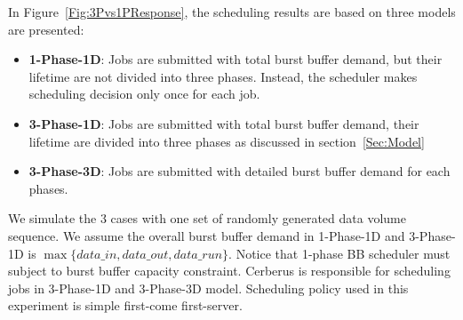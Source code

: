 
In Figure~\ref{Fig:3Pvs1PResponse}, the scheduling results are based on three models
are presented:
\begin{itemize}
        \item \textbf{1-Phase-1D}: Jobs are submitted with total burst buffer demand, 
        but their lifetime are not divided into three phases. 
	Instead, the scheduler makes scheduling decision only once for each job.

        \item \textbf{3-Phase-1D}: Jobs are submitted with total burst buffer demand,
        their lifetime are divided into three phases as discussed in section~\ref{Sec:Model}
        
        \item \textbf{3-Phase-3D}: Jobs are submitted with detailed burst buffer demand for each phases.
\end{itemize}
We simulate the 3 cases with one set of randomly generated data volume sequence.
We assume the overall burst buffer demand in 1-Phase-1D and 3-Phase-1D is
$\max \{data\_in, data\_out, data\_run\}$.
Notice that 1-phase BB scheduler must subject to burst buffer capacity constraint.
Cerberus is responsible for scheduling jobs in 3-Phase-1D and 3-Phase-3D model.
Scheduling policy used in this experiment is simple first-come first-server.

